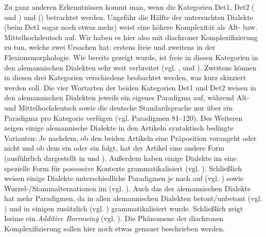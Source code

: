Zu ganz anderen Erkenntnissen kommt man, wenn die Kategorien Det1, Det2 ( und ) und  () betrachtet werden. Ungefähr die Hälfte der untersuchten Dialekte (beim Det1 sogar noch etwas mehr) weist eine höhere Komplexität als Alt- bzw. Mittelhochdeutsch auf. Wir haben es hier also mit diachroner Komplexifizierung zu tun, welche zwei Ursachen hat: erstens freie  und zweitens  in der Flexionsmorphologie. Wie bereits gezeigt wurde, ist freie  in diesen Kategorien in den alemannischen Dialekten sehr weit verbreitet (vgl. ,  und ). Zweitens können in diesen drei Kategorien verschiedene  beobachtet werden, was kurz skizziert werden soll. Die vier Wortarten der beiden Kategorien Det1 und Det2 weisen in den alemannischen Dialekten jeweils ein eigenes Paradigma auf, während Alt- und Mittelhochdeutsch sowie die deutsche Standardsprache nur über ein Paradigma pro Kategorie verfügen (vgl. Paradigmen 81–120). Des Weiteren zeigen einige alemannische Dialekte in den Artikeln syntaktisch bedingte Varianten: Je nachdem, ob den beiden Artikeln eine Präposition vorangeht oder nicht und ob dem  ein  oder ein  folgt, hat der Artikel eine andere Form (ausführlich dargestellt in  und ). Außerdem haben einige Dialekte im  eine spezielle Form für possessive Kontexte grammatikalisiert (vgl. ). Schließlich weisen einige Dialekte unterschiedliche Paradigmen je nach  auf (vgl. ) sowie Wur\-zel-/Stamm\-al\-ter\-na\-tio\-nen im  (vgl. ). Auch das  der alemannischen Dialekte hat mehr Paradigmen, da in allen alemannischen Dialekten betont/unbetont (vgl. ) und in einigen zusätzlich  (vgl. ) grammatikalisiert wurde. Schließlich zeigt Issime ein \textit{Additive Borrowing} (vgl. ). Die Phänomene der diachronen Komplexifizierung sollen hier noch etwas genauer beschrieben werden.

